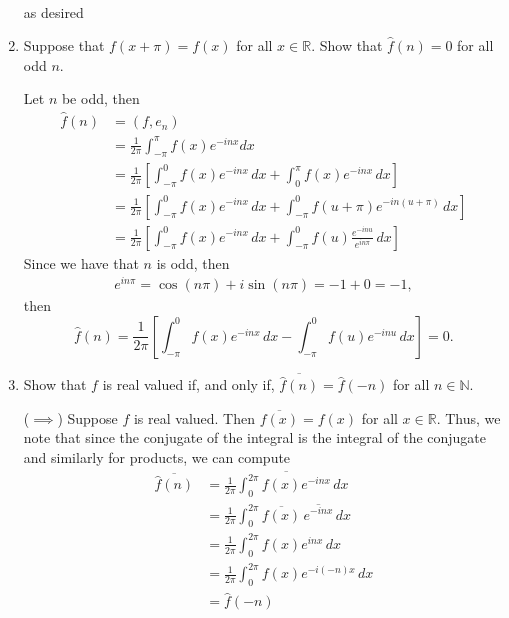 \documentclass[11pt]{article}
\newcommand{\bbN}{\mathbb{N}}
\newcommand{\bbR}{\mathbb{R}}
\begin{document}
\begin{problem}
\begin{enumerate}
\begin{solution}
\begin{align*}
\end{align*}
as desired
\end{solution}
\item
Suppose that $f(x + \pi) = f(x)$ for all $x\in \bbR.$ Show that $\hat{f}(n) = 0$ for all odd $n.$
\begin{solution}
    Let $n$ be odd, then 
    \begin{align*}
        \hat{f}(n) &= (f,e_{n})\\
        &= \frac{1}{2\pi}\int_{-\pi}^{\pi} f(x)e^{-inx}dx\\
        &= \frac{1}{2\pi}\left[\int_{-\pi}^0 f(x)e^{-inx}\,dx + \int_0^{\pi} f(x)e^{-inx}\, dx\right]\\
        &= \frac{1}{2\pi}\left[\int_{-\pi}^0 f(x)e^{-inx}\,dx + \int_{-\pi}^{0} f(u+\pi)e^{-in(u + \pi)}\,dx\right]\\
        &= \frac{1}{2\pi}\left[\int_{-\pi}^0 f(x)e^{-inx}\,dx + \int_{-\pi}^{0} f(u)\frac{e^{-inu}}{e^{in\pi}}\,dx\right]
    \end{align*}
Since we have that $n$ is odd, then
\begin{align*}
    e^{in\pi} = \cos(n\pi) + i\sin(n\pi)
    = -1 + 0 = -1,
\end{align*}
then 
\[\hat{f}(n) = \frac{1}{2\pi}\left[\int_{-\pi}^0 f(x)e^{-inx}\,dx - \int_{-\pi}^{0} f(u)e^{-inu}\,dx\right] = 0.\]
\end{solution}
\item 
Show that $f$ is real valued if, and only if, $\overline{\hat{f}(n)} = \hat{f}(-n)$ for all $n \in \bbN.$
\begin{solution}
    ($\implies$) Suppose $f$ is real valued. Then $\overline{f(x)} = f(x)$ for all $x\in \bbR.$ Thus, we note that since the conjugate of the integral is the integral of the conjugate and similarly for products, we can compute
    \begin{align*}
        \overline{\hat{f}(n)} &= \overline{\frac{1}{2\pi}\int_0^{2\pi}f(x)e^{-inx}\,dx}\\
        &=  \frac{1}{2\pi}\int_0^{2\pi}\overline{f(x)}\,\overline{e^{-inx}}\,dx\\
        &= \frac{1}{2\pi}\int_0^{2\pi}f(x)e^{inx}\,dx\\
        &= \frac{1}{2\pi}\int_0^{2\pi}f(x)e^{-i(-n)x}\,dx\\
        &= \hat{f}(-n)
    \end{align*}
\end{solution}
    \end{enumerate}
\end{problem}
\end{document}
